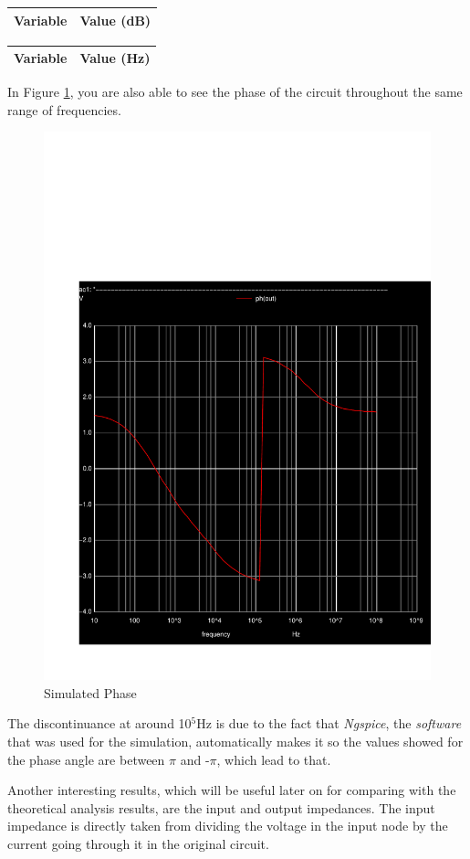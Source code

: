 \begin{center}
\begin{tabular}{|l|r|}
  \hline    
  {\bf Variable} & {\bf Value (dB)} \\ \hline
  
\end{tabular}
\end{center}

\begin{center}
\begin{tabular}{|l|r|}
  \hline    
  {\bf Variable} & {\bf Value (Hz)} \\ \hline
  
\end{tabular}
\end{center}

In Figure \ref{fig:sim-phase}, you are also able to see the phase of the circuit throughout the same range of frequencies.

\begin{figure}[H] \centering
\includegraphics[width=0.5\linewidth]{../sim/phase.pdf}
\caption{Simulated Phase}
\label{fig:sim-phase}
\end{figure}

The discontinuance at around 10$^5$Hz is due to the fact that \textit{Ngspice}, the \textit{software} that was used for the simulation, automatically makes it so the values showed for the phase angle are between $\pi$ and -$\pi$, which lead to that. 

Another interesting results, which will be useful later on for comparing with the theoretical analysis results, are the input and output impedances. The input impedance is directly taken from dividing the voltage in the input node by the current going through it in the original circuit.

